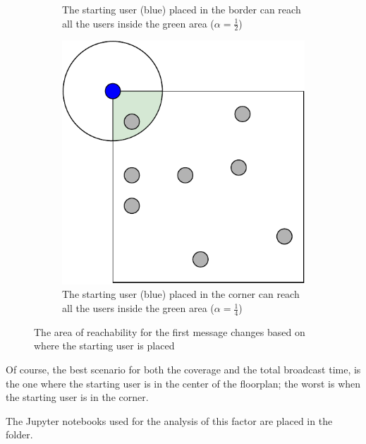 \begin{figure}[hbt]
\begin{subfigure}{0.35\textwidth}
		\caption{The starting user (blue) placed in the border can reach
		all the users inside the green
		area (\(\alpha = \frac{1}{2}\))}\label{subfig:startnodeborder}
	\end{subfigure}
	\begin{subfigure}{0.35\textwidth}
		\centering
		\includegraphics[width=\textwidth]{img/start-node-position-corner}
		\caption{The starting user (blue) placed in the corner can reach
		all the users inside the green
		area (\(\alpha = \frac{1}{4}\))}\label{subfig:startnodecorner}
	\end{subfigure}
	\caption{The area of reachability for the first message changes based on
	where the starting user is placed}\label{fig:startnodeexplain}
\end{figure}

Of course, the best scenario for both the coverage and the total broadcast time,
is the one where the starting user is in the center of the floorplan; the worst
is when the starting user is in the corner.

The Jupyter notebooks used for the analysis of this factor are placed in the
 folder.



